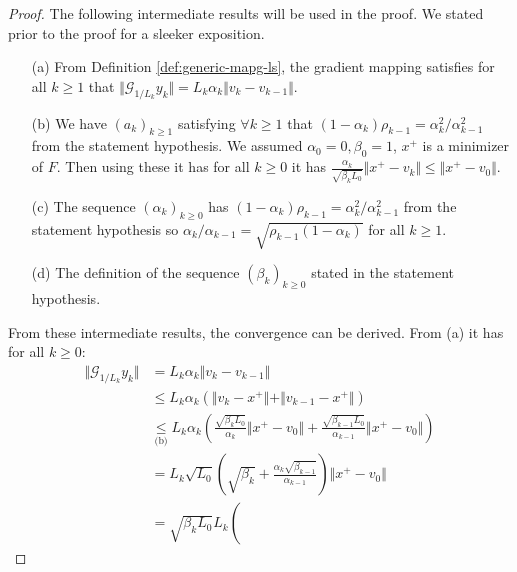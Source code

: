 \documentclass[12pt]{report}
\begin{document}
        \begin{proof}
            The following intermediate results will be used in the proof. 
            We stated prior to the proof for a sleeker exposition. 
            \begin{enumerate}
                \item[(a)] From Definition \ref{def:generic-mapg-ls}, the gradient mapping satisfies for all $k \ge 1$ that $\Vert \mathcal G_{1/L_k} y_k\Vert = L_k\alpha_k \Vert v_k - v_{k - 1}\Vert$.
                \item[(b)] We have $(a_k)_{k \ge 1}$ satisfying $\forall k \ge 1$ that $(1 - \alpha_k)\rho_{k - 1} = \alpha_k^2/\alpha_{k - 1}^2$ from the statement hypothesis. We assumed $\alpha_0 = 0, \beta_0 = 1$, $x^+$ is a minimizer of $F$. Then using these it has for all $k \ge 0$ it has $\frac{\alpha_k}{\sqrt{\beta_k L_0}}\Vert x^+ - v_k\Vert \le \Vert x^+ - v_0\Vert$. 
                \item[(c)] The sequence $(\alpha_k)_{k \ge 0}$ has $(1 - \alpha_k)\rho_{k - 1} = \alpha_k^2/\alpha_{k - 1}^2$ from the statement hypothesis so $\alpha_k/\alpha_{k - 1} = \sqrt{\rho_{k - 1}(1 - \alpha_k)}$ for all $k \ge 1$. 
                \item[(d)] The definition of the sequence $(\beta_k)_{k \ge 0}$ stated in the statement hypothesis. 
            \end{enumerate}
            From these intermediate results, the convergence can be derived. 
            From (a) it has for all $k \ge 0$: 
            \begin{align*}
                \Vert \mathcal G_{1/L_k} y_k\Vert 
                &= L_k\alpha_k \Vert v_k - v_{k - 1}\Vert
                \\
                &\le 
                L_k\alpha_k(\Vert v_k - x^+\Vert + \Vert v_{k - 1} - x^+\Vert)
                \\
                &\underset{\text{(b)}}{\le} 
                L_k \alpha_k \left(
                    \frac{\sqrt{\beta_kL_0}}{\alpha_k}\Vert x^+ - v_0\Vert
                    +
                    \frac{\sqrt{\beta_{k - 1}L_0}}{\alpha_{k - 1}}\Vert x^+ - v_0\Vert
                \right) 
                \\
                &= L_k\sqrt{L_0} \left(
                    \sqrt{\beta_k}
                    +
                    \frac{\alpha_k\sqrt{\beta_{k - 1}}}{\alpha_{k - 1}}
                \right)\Vert x^+ - v_0\Vert
                \\
                &= \sqrt{\beta_k L_0}L_k \left(

\end{align*}
\end{proof}
\end{document}

